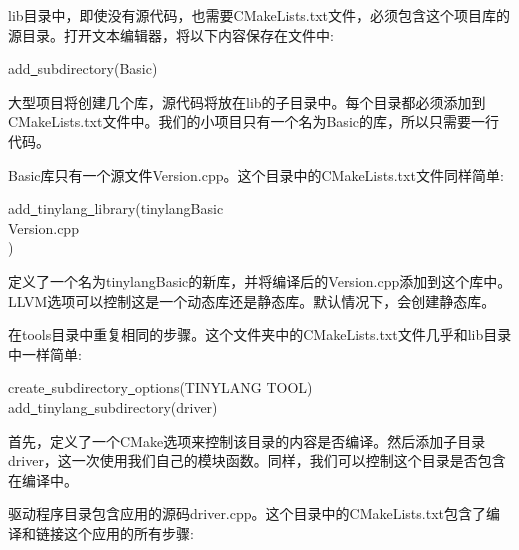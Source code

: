 lib目录中，即使没有源代码，也需要CMakeLists.txt文件，必须包含这个项目库的源目录。打开文本编辑器，将以下内容保存在文件中:\par

\begin{tcolorbox}[colback=white,colframe=black]
add\underline{~}subdirectory(Basic)
\end{tcolorbox}

大型项目将创建几个库，源代码将放在lib的子目录中。每个目录都必须添加到CMakeLists.txt文件中。我们的小项目只有一个名为Basic的库，所以只需要一行代码。\par

Basic库只有一个源文件Version.cpp。这个目录中的CMakeLists.txt文件同样简单:\par

\begin{tcolorbox}[colback=white,colframe=black]
add\underline{~}tinylang\underline{~}library(tinylangBasic \\
\hspace*{0.5cm}Version.cpp \\
)
\end{tcolorbox}

定义了一个名为tinylangBasic的新库，并将编译后的Version.cpp添加到这个库中。LLVM选项可以控制这是一个动态库还是静态库。默认情况下，会创建静态库。\par

在tools目录中重复相同的步骤。这个文件夹中的CMakeLists.txt文件几乎和lib目录中一样简单:\par

\begin{tcolorbox}[colback=white,colframe=black]
create\underline{~}subdirectory\underline{~}options(TINYLANG TOOL) \\
add\underline{~}tinylang\underline{~}subdirectory(driver)
\end{tcolorbox}

首先，定义了一个CMake选项来控制该目录的内容是否编译。然后添加子目录driver，这一次使用我们自己的模块函数。同样，我们可以控制这个目录是否包含在编译中。\par

驱动程序目录包含应用的源码driver.cpp。这个目录中的CMakeLists.txt包含了编译和链接这个应用的所有步骤:\par

